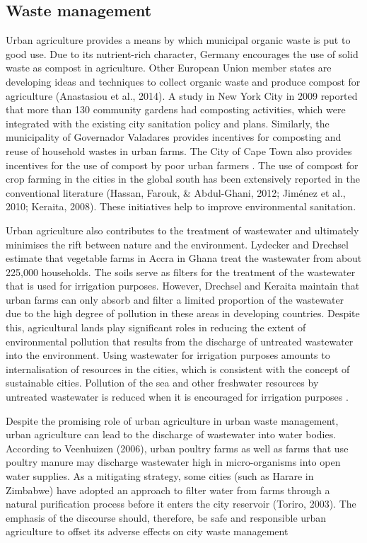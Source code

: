 \subsection{Waste management}

Urban agriculture provides a means by which municipal organic waste is put to good use. Due to its nutrient-rich character, Germany encourages the use of solid waste as compost in agriculture. Other European Union member states are developing ideas and techniques to collect organic waste and produce compost for agriculture (Anastasiou et al., 2014). A study in New York City in 2009 reported that more than 130 community gardens had composting activities, which were integrated with the existing city sanitation policy and plans. Similarly, the municipality of Governador Valadares provides incentives for composting and reuse of household wastes in urban farms. The City of Cape Town also provides incentives for the use of compost by poor urban farmers \cite{Hoornweg2012}. The use of compost for crop farming in the cities in the global south has been extensively reported in the conventional literature \cite{Amoah2007} (Hassan, Farouk, \& Abdul-Ghani, 2012; Jiménez et al., 2010; Keraita, 2008). These initiatives help to improve environmental sanitation.

Urban agriculture also contributes to the treatment of wastewater and ultimately minimises the rift between nature and the environment. Lydecker and Drechsel \cite{Lydecker2010} estimate that vegetable farms in Accra in Ghana treat the wastewater from about 225,000 households. The soils serve as filters for the treatment of the wastewater that is used for irrigation purposes. However, Drechsel and Keraita \cite{Drechsel2014} maintain that urban farms can only absorb and filter a limited proportion of the wastewater due to the high degree of pollution in these areas in developing countries. Despite this, agricultural lands play significant roles in reducing the extent of environmental pollution that results from the discharge of untreated wastewater into the environment. Using wastewater for irrigation purposes amounts to internalisation of resources in the cities, which is consistent with the concept of sustainable cities. Pollution of the sea and other freshwater resources by untreated wastewater is reduced when it is encouraged for irrigation purposes \cite{Liu2013}.

Despite the promising role of urban agriculture in urban waste management, urban agriculture can lead to the discharge of wastewater into water bodies. According to Veenhuizen (2006), urban poultry farms as well as farms that use poultry manure may discharge wastewater high in micro-organisms into open water supplies. As a mitigating strategy, some cities (such as Harare in Zimbabwe) have adopted an approach to filter water from farms through a natural purification process before it enters the city reservoir (Toriro, 2003). The emphasis of the discourse should, therefore, be safe and responsible urban agriculture to offset its adverse effects on city waste management

